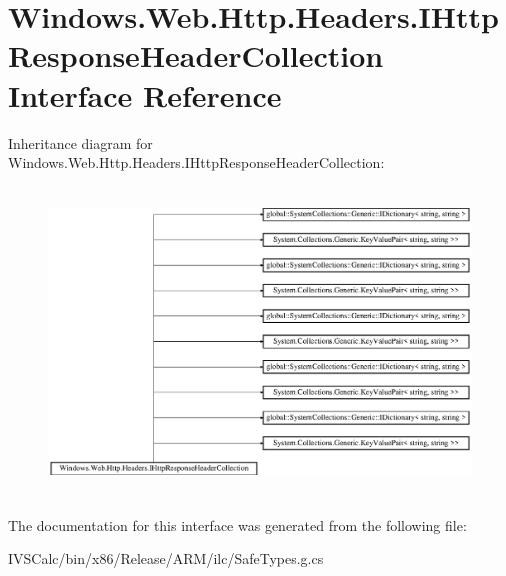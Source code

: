 \hypertarget{interface_windows_1_1_web_1_1_http_1_1_headers_1_1_i_http_response_header_collection}{}\section{Windows.\+Web.\+Http.\+Headers.\+I\+Http\+Response\+Header\+Collection Interface Reference}
\label{interface_windows_1_1_web_1_1_http_1_1_headers_1_1_i_http_response_header_collection}
Inheritance diagram for Windows.\+Web.\+Http.\+Headers.\+I\+Http\+Response\+Header\+Collection\+:\begin{figure}[H]
\begin{center}
\leavevmode
\includegraphics[height=8.213333cm]{interface_windows_1_1_web_1_1_http_1_1_headers_1_1_i_http_response_header_collection}
\end{center}
\end{figure}


The documentation for this interface was generated from the following file\+:\begin{DoxyCompactItemize}
\item 
I\+V\+S\+Calc/bin/x86/\+Release/\+A\+R\+M/ilc/Safe\+Types.\+g.\+cs\end{DoxyCompactItemize}
